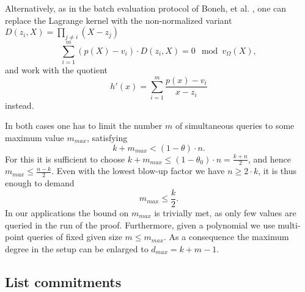 \documentclass[11pt]{article}
\theoremstyle{definition}
\theoremstyle{remark}
\begin{document}
Alternatively, as in the batch evaluation protocol of Boneh, et al. \cite{HaloInfinite}, one can replace the Lagrange kernel with the non-normalized variant $D(z_i,X)=\prod_{j\neq i} (X-z_j)$ 
\begin{equation}
\label{e:MultiEvalIdentity2}
\sum_{i=1}^m (p(X)-v_i) \cdot D(z_i,X) =  
0 \mod v_\Omega(X),
\end{equation}
and work with the quotient 
\[
h'(x) =%
\sum_{i=1}^m \frac{p(x)-v_i}{x-z_i}
\]
instead.

In both cases one has to limit the number $m$ of simultaneous queries to some maximum value $m_{max}$, satisfying 
\[
k+m_{max} < (1-\theta)\cdot n.
\]
For this it is sufficient to choose $k+m_{max} \leq  (1- \theta_0)\cdot n =\frac{k+n}{2}$, and hence $m_{max}\leq\frac{n-k}{2}$. 
Even with the lowest blow-up factor we have $n\geq 2\cdot k$, it is thus enough to demand
\begin{equation}
m_{max}\leq \frac{k}{2}.
\end{equation}
In our applications the bound on $m_{max}$ is trivially met, as only few values are queried in the run of the proof. 
Furthermore, given a polynomial we use multi-point queries of fixed given size $m\leq m_{max}$. 
As a consequence the maximum degree in the setup can be enlarged to $d_{max}= k+m-1$.  

\subsection{List commitments}
\end{document}
